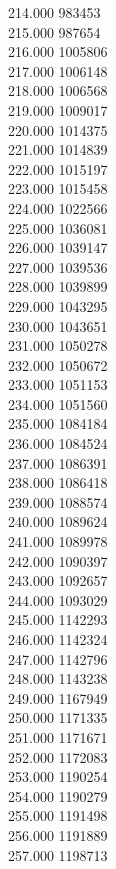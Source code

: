 { 214.000	983453 \\
 215.000	987654 \\
 216.000	1005806 \\
 217.000	1006148 \\
 218.000	1006568 \\
 219.000	1009017 \\
 220.000	1014375 \\
 221.000	1014839 \\
 222.000	1015197 \\
 223.000	1015458 \\
 224.000	1022566 \\
 225.000	1036081 \\
 226.000	1039147 \\
 227.000	1039536 \\
 228.000	1039899 \\
 229.000	1043295 \\
 230.000	1043651 \\
 231.000	1050278 \\
 232.000	1050672 \\
 233.000	1051153 \\
 234.000	1051560 \\
 235.000	1084184 \\
 236.000	1084524 \\
 237.000	1086391 \\
 238.000	1086418 \\
 239.000	1088574 \\
 240.000	1089624 \\
 241.000	1089978 \\
 242.000	1090397 \\
 243.000	1092657 \\
 244.000	1093029 \\
 245.000	1142293 \\
 246.000	1142324 \\
 247.000	1142796 \\
 248.000	1143238 \\
 249.000	1167949 \\
 250.000	1171335 \\
 251.000	1171671 \\
 252.000	1172083 \\
 253.000	1190254 \\
 254.000	1190279 \\
 255.000	1191498 \\
 256.000	1191889 \\
 257.000	1198713 \\
}
